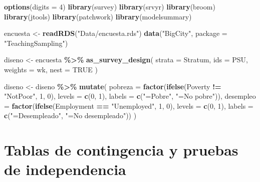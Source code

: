 \documentclass[
  spanish,
  12pt,
]{book}
\newenvironment{Shaded}{\begin{snugshade}}{\end{snugshade}}
\newcommand{\AttributeTok}[1]{\textcolor[rgb]{0.13,0.29,0.53}{#1}}
\newcommand{\ConstantTok}[1]{\textcolor[rgb]{0.56,0.35,0.01}{#1}}
\newcommand{\DecValTok}[1]{\textcolor[rgb]{0.00,0.00,0.81}{#1}}
\newcommand{\FunctionTok}[1]{\textcolor[rgb]{0.13,0.29,0.53}{\textbf{#1}}}
\newcommand{\NormalTok}[1]{#1}
\newcommand{\OtherTok}[1]{\textcolor[rgb]{0.56,0.35,0.01}{#1}}
\newcommand{\SpecialCharTok}[1]{\textcolor[rgb]{0.81,0.36,0.00}{\textbf{#1}}}
\newcommand{\StringTok}[1]{\textcolor[rgb]{0.31,0.60,0.02}{#1}}
\begin{document}
\begin{Shaded}
\begin{Highlighting}[]
\FunctionTok{options}\NormalTok{(}\AttributeTok{digits =} \DecValTok{4}\NormalTok{)}
\FunctionTok{library}\NormalTok{(survey)}
\FunctionTok{library}\NormalTok{(srvyr)}
\FunctionTok{library}\NormalTok{(broom)}
\FunctionTok{library}\NormalTok{(jtools)}
\FunctionTok{library}\NormalTok{(patchwork)}
\FunctionTok{library}\NormalTok{(modelsummary)}

\NormalTok{encuesta }\OtherTok{\textless{}{-}} \FunctionTok{readRDS}\NormalTok{(}\StringTok{"Data/encuesta.rds"}\NormalTok{)}
\FunctionTok{data}\NormalTok{(}\StringTok{"BigCity"}\NormalTok{, }\AttributeTok{package =} \StringTok{"TeachingSampling"}\NormalTok{)}

\NormalTok{diseno }\OtherTok{\textless{}{-}}\NormalTok{ encuesta }\SpecialCharTok{\%\textgreater{}\%}
  \FunctionTok{as\_survey\_design}\NormalTok{(}
    \AttributeTok{strata  =}\NormalTok{ Stratum,}
    \AttributeTok{ids     =}\NormalTok{ PSU,}
    \AttributeTok{weights =}\NormalTok{ wk,}
    \AttributeTok{nest    =} \ConstantTok{TRUE}
\NormalTok{  )}

\NormalTok{diseno }\OtherTok{\textless{}{-}}\NormalTok{ diseno }\SpecialCharTok{\%\textgreater{}\%}
  \FunctionTok{mutate}\NormalTok{(}
    \AttributeTok{pobreza   =} \FunctionTok{factor}\NormalTok{(}\FunctionTok{ifelse}\NormalTok{(Poverty }\SpecialCharTok{!=} \StringTok{"NotPoor"}\NormalTok{, }\DecValTok{1}\NormalTok{, }\DecValTok{0}\NormalTok{), }
                       \AttributeTok{levels =} \FunctionTok{c}\NormalTok{(}\DecValTok{0}\NormalTok{, }\DecValTok{1}\NormalTok{), }
                       \AttributeTok{labels =} \FunctionTok{c}\NormalTok{(}\StringTok{"=Pobre"}\NormalTok{, }\StringTok{"=No pobre"}\NormalTok{)),}
    \AttributeTok{desempleo =} \FunctionTok{factor}\NormalTok{(}\FunctionTok{ifelse}\NormalTok{(Employment }\SpecialCharTok{==} \StringTok{"Unemployed"}\NormalTok{, }\DecValTok{1}\NormalTok{, }\DecValTok{0}\NormalTok{),}
                       \AttributeTok{levels =} \FunctionTok{c}\NormalTok{(}\DecValTok{0}\NormalTok{, }\DecValTok{1}\NormalTok{), }
                       \AttributeTok{labels =} \FunctionTok{c}\NormalTok{(}\StringTok{"=Desempleado"}\NormalTok{, }\StringTok{"=No desempleado"}\NormalTok{))}
\NormalTok{  )}
\end{Highlighting}
\end{Shaded}

\section{Tablas de contingencia y pruebas de independencia}\label{sec-independencia}
\end{document}
